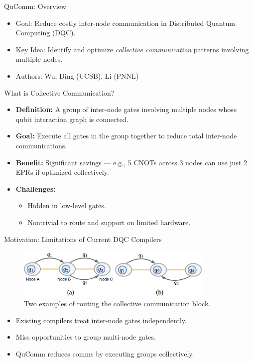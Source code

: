 \documentclass{beamer}
\begin{document}
	\begin{frame}{QuComm: Overview}
		\begin{itemize}
			\item Goal: Reduce costly inter-node communication in Distributed Quantum Computing (DQC).
			\item Key Idea: Identify and optimize \emph{collective communication} patterns involving multiple nodes.
			\item Authors: Wu, Ding (UCSB), Li (PNNL)
		\end{itemize}
	\end{frame}
	
	\begin{frame}{What is Collective Communication?}
		\begin{itemize}
			\item \textbf{Definition:} A group of inter-node gates involving multiple nodes whose qubit interaction graph is connected.
			\item \textbf{Goal:} Execute all gates in the group together to reduce total inter-node communications.
			\item \textbf{Benefit:} Significant savings — e.g., 5 CNOTs across 3 nodes can use just 2 EPRs if optimized collectively.
			\item \textbf{Challenges:}
			\begin{itemize}
				\item Hidden in low-level gates.
				\item Nontrivial to route and support on limited hardware.
			\end{itemize}
		\end{itemize}
	\end{frame}
	
	\begin{frame}{Motivation: Limitations of Current DQC Compilers}
		\begin{figure}
			\includegraphics[width=0.85\textwidth]{figure/routing.png}
			\caption[]{Two examples of routing the collective communication block.}
		\end{figure}
		\begin{itemize}
			\item Existing compilers treat inter-node gates independently.
			\item Miss opportunities to group multi-node gates.
			\item QuComm reduces comms by executing groups collectively.
		\end{itemize}
	\end{frame}
\end{document}
